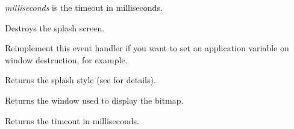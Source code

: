 {\it milliseconds} is the timeout in milliseconds.

\label{wxsplashscreendtor}


Destroys the splash screen.

\label{wxsplashscreenonclosewindow}


Reimplement this event handler if you want to set an application variable on window destruction, for example.

\label{wxsplashscreengetsplashstyle}


Returns the splash style (see  for
details).

\label{wxsplashscreengetsplashwindow}


Returns the window used to display the bitmap.

\label{wxsplashscreengettimeout}


Returns the timeout in milliseconds.

